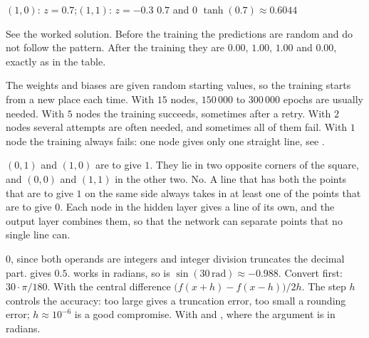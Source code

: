 \begin{facit}
  $(1, 0)$: $z = 0.7$;\enspace $(1, 1)$: $z = -0.3$
 $0.7$ and $0$  $\tanh(0.7) \approx 0.6044$

  See the worked solution.
 Before the training the predictions are random and do not follow the pattern. After the
training they are $0.00$, $1.00$, $1.00$ and $0.00$, exactly as in the table.

  The weights and biases are given random starting values, so the training starts
from a new place each time. With $15$ nodes, $150\,000$ to $300\,000$ epochs are usually needed.
 With $5$ nodes the training succeeds, sometimes after a retry. With $2$ nodes several
attempts are often needed, and sometimes all of them fail. With $1$ node the training always
fails: one node gives only one straight line, see .

  $(0, 1)$ and $(1, 0)$ are to give $1$. They lie in two opposite corners of the
square, and $(0, 0)$ and $(1, 1)$ in the other two.
 No. A line that has both the points that are to give $1$ on the same side always takes in
at least one of the points that are to give $0$. Each node in the hidden layer gives a line of its
own, and the output layer combines them, so that the network can separate points that no single
line can.

  $0$, since both operands are integers and integer division
truncates the decimal part.  gives $0.5$.
  works in radians, so  is $\sin(30\,\text{rad}) \approx
-0.988$. Convert first: $30 \cdot \pi/180$.
 With the central difference $\bigl(f(x + h) - f(x - h)\bigr)/2h$. The step $h$ controls
the accuracy: too large gives a truncation error, too small a rounding error; $h \approx 10^{-6}$
is a good compromise.
 With  and , where the argument is in
radians.

\end{facit}
